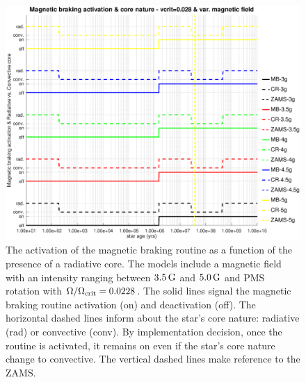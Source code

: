 \documentclass[fleqn,usenatbib]{mnras}
\begin{document}
{{\begin{figure}
	\includegraphics[trim = 30mm 15mm 15mm 15mm, clip,width=\columnwidth]{figures/mb_act_vc_028_var_g.eps}
    \caption{The activation of the magnetic braking routine as a function of the presence of a radiative core. The models include a magnetic field with an intensity ranging between $3.5\,\mathrm{G}$ and $5.0\,\mathrm{G}$ and PMS rotation with $\Omega / \Omega_{\mathrm{crit}}=0.0228$. The solid lines signal the magnetic braking routine activation (on) and deactivation (off). The horizontal dashed lines inform about the star's core nature: radiative (rad) or convective (conv). By implementation decision, once the routine is activated, it remains on even if the star's core nature change to convective. The vertical dashed lines make reference to the ZAMS.}
    \label{fig:mb_act_var_vel_vc_028}
\end{figure}


}}
\end{document}
